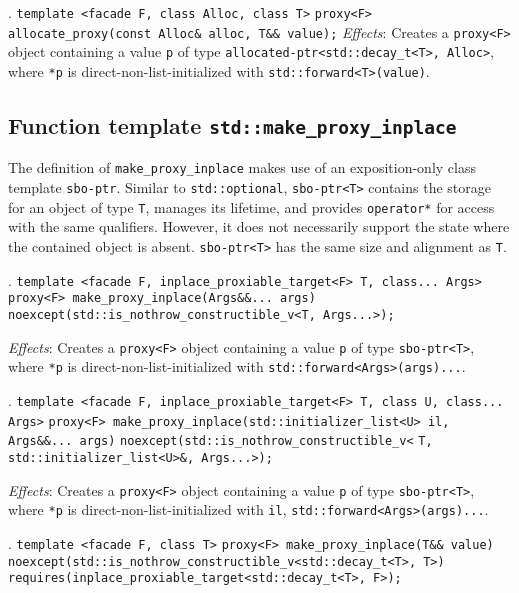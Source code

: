 \documentclass[10pt, a4paper, oneside]{article}
\begin{document}
. \verb|template <facade F, class Alloc, class T>|\smallbreak
\indent \verb|proxy<F> allocate_proxy(const Alloc& alloc, T&& value);|
\medbreak
\textit{Effects}: Creates a \verb|proxy<F>| object containing a value \verb|p| of type \verb|allocated-ptr<std::decay_t<T>, Alloc>|,
where \verb|*p| is direct\hyp{}non\hyp{}list\hyp{}initialized with \verb|std::forward<T>(value)|.

\subsection{Function template \texttt{std::make\_proxy\_inplace}}
The definition of \verb|make_proxy_inplace| makes use of an exposition-only class template \verb|sbo-ptr|.
Similar to \verb|std::optional|, \verb|sbo-ptr<T>| contains the storage for an object of type \verb|T|, manages its lifetime,
and provides \verb|operator*| for access with the same qualifiers.
However, it does not necessarily support the state where the contained object is absent.
\verb|sbo-ptr<T>| has the same size and alignment as \verb|T|.\medbreak

. \verb|template <facade F, inplace_proxiable_target<F> T, class... Args>|\smallbreak
\indent \verb|proxy<F> make_proxy_inplace(Args&&... args)|\smallbreak
\indent \indent \verb|noexcept(std::is_nothrow_constructible_v<T, Args...>);|

\textit{Effects}: Creates a \verb|proxy<F>| object containing a value \verb|p| of type \verb|sbo-ptr<T>|, 
where \verb|*p| is direct\hyp{}non\hyp{}list\hyp{}initialized with \verb|std::forward<Args>(args)...|.
\medbreak

. \verb|template <facade F, inplace_proxiable_target<F> T, class U, class... Args>|\smallbreak
\indent \verb|proxy<F> make_proxy_inplace(std::initializer_list<U> il, Args&&... args)|\smallbreak
\indent \indent \verb|noexcept(std::is_nothrow_constructible_v<|\smallbreak
\indent \indent \indent \verb|T, std::initializer_list<U>&, Args...>);|

\textit{Effects}: Creates a \verb|proxy<F>| object containing a value \verb|p| of type \verb|sbo-ptr<T>|,
where \verb|*p| is direct\hyp{}non\hyp{}list\hyp{}initialized with \verb|il|, \verb|std::forward<Args>(args)...|.
\medbreak

. \verb|template <facade F, class T>|\smallbreak
\indent \verb|proxy<F> make_proxy_inplace(T&& value)|\smallbreak
\indent \indent \verb|noexcept(std::is_nothrow_constructible_v<std::decay_t<T>, T>)|\smallbreak
\indent \indent \verb|requires(inplace_proxiable_target<std::decay_t<T>, F>);|
\end{document}
